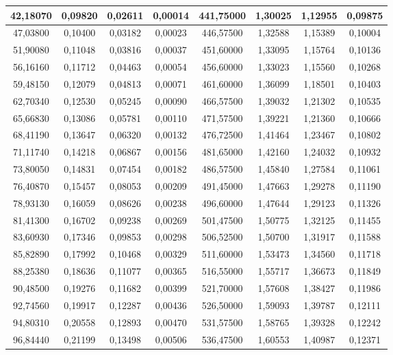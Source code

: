 \documentclass[a4paper,12pt]{article}
\numberwithin{equation}{section}
\begin{document}
\begin{appendices}
\begin{longtable}[c]{|c|c|c|c|c|c|c|c|}
42,18070	&	0,09820	&	0,02611	&	0,00014	&	441,75000	&	1,30025	&	1,12955	&	0,09875	\\\hline
47,03800	&	0,10400	&	0,03182	&	0,00023	&	446,57500	&	1,32588	&	1,15389	&	0,10004	\\\hline
51,90080	&	0,11048	&	0,03816	&	0,00037	&	451,60000	&	1,33095	&	1,15764	&	0,10136	\\\hline
56,16160	&	0,11712	&	0,04463	&	0,00054	&	456,60000	&	1,33023	&	1,15560	&	0,10268	\\\hline
59,48150	&	0,12079	&	0,04813	&	0,00071	&	461,60000	&	1,36099	&	1,18501	&	0,10403	\\\hline
62,70340	&	0,12530	&	0,05245	&	0,00090	&	466,57500	&	1,39032	&	1,21302	&	0,10535	\\\hline
65,66830	&	0,13086	&	0,05781	&	0,00110	&	471,57500	&	1,39221	&	1,21360	&	0,10666	\\\hline
68,41190	&	0,13647	&	0,06320	&	0,00132	&	476,72500	&	1,41464	&	1,23467	&	0,10802	\\\hline
71,11740	&	0,14218	&	0,06867	&	0,00156	&	481,65000	&	1,42160	&	1,24032	&	0,10932	\\\hline
73,80050	&	0,14831	&	0,07454	&	0,00182	&	486,57500	&	1,45840	&	1,27584	&	0,11061	\\\hline
76,40870	&	0,15457	&	0,08053	&	0,00209	&	491,45000	&	1,47663	&	1,29278	&	0,11190	\\\hline
78,93130	&	0,16059	&	0,08626	&	0,00238	&	496,60000	&	1,47644	&	1,29123	&	0,11326	\\\hline
81,41300	&	0,16702	&	0,09238	&	0,00269	&	501,47500	&	1,50775	&	1,32125	&	0,11455	\\\hline
83,60930	&	0,17346	&	0,09853	&	0,00298	&	506,52500	&	1,50700	&	1,31917	&	0,11588	\\\hline
85,82890	&	0,17992	&	0,10468	&	0,00329	&	511,60000	&	1,53473	&	1,34560	&	0,11718	\\\hline
88,25380	&	0,18636	&	0,11077	&	0,00365	&	516,55000	&	1,55717	&	1,36673	&	0,11849	\\\hline
90,48500	&	0,19276	&	0,11682	&	0,00399	&	521,70000	&	1,57608	&	1,38427	&	0,11986	\\\hline
92,74560	&	0,19917	&	0,12287	&	0,00436	&	526,50000	&	1,59093	&	1,39787	&	0,12111	\\\hline
94,80310	&	0,20558	&	0,12893	&	0,00470	&	531,57500	&	1,58765	&	1,39328	&	0,12242	\\\hline
96,84440	&	0,21199	&	0,13498	&	0,00506	&	536,47500	&	1,60553	&	1,40987	&	0,12371	\\\hline

\end{longtable}
\end{appendices}
\end{document}
